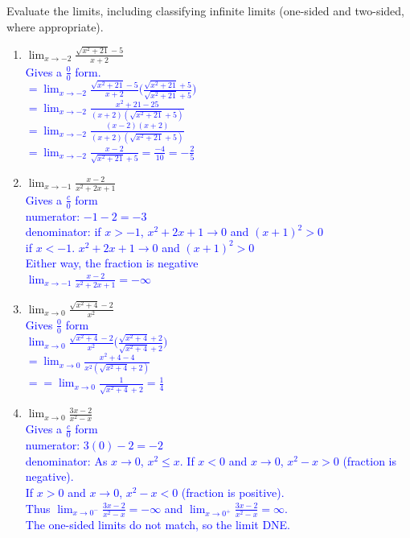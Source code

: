 \documentclass{ximera}
\begin{document}
\begin{exercise}
    Evaluate the limits, including classifying infinite limits (one-sided and two-sided, where appropriate).
\begin{enumerate}
    \item $\displaystyle \lim_{x\rightarrow -2}\frac{\sqrt{x^2+21}-5}{x+2}$ \\
    \textcolor{blue}{ Gives a $\frac{0}{0}$ form.\\
    $\displaystyle=\lim_{x\rightarrow -2} \frac{\sqrt{x^2+21}-5}{x+2}\bigg(\frac{\sqrt{x^2+21}+5}{\sqrt{x^2+21}+5}\bigg)$\\
    $\displaystyle=\lim_{x\rightarrow-2} \frac{x^2+21-25}{(x+2)(\sqrt{x^2+21}+5)}$\\
    $\displaystyle=\lim_{x\rightarrow -2}\frac{(x-2)(x+2)}{(x+2)(\sqrt{x^2+21}+5)}$\\
    $\displaystyle=\lim_{x\rightarrow -2}\frac{x-2}{\sqrt{x^2+21}+5}=\frac{-4}{10}=-\frac25$}
    
    \item $\displaystyle \lim_{x\rightarrow -1}\frac{x-2}{x^2+2x+1}$ \\
    \textcolor{blue}{ Gives a $\frac{c}{0}$ form\\
    numerator: $-1-2=-3$\\
    denominator: if $x>-1$, $x^2+2x+1\rightarrow 0$ and $(x+1)^2>0$\\
    if $x<-1$. $x^2+2x+1\rightarrow 0$ and $(x+1)^2>0$\\
    Either way, the fraction is negative\\
    $\displaystyle\lim_{x\rightarrow -1}\frac{x-2}{x^2+2x+1}=-\infty$}
    
    
    \item $\displaystyle\lim_{x\rightarrow 0}\frac{\sqrt{x^2+4}-2}{x^2}$ \\
    \textcolor{blue}{ Gives $\frac00$ form\\
    $\displaystyle\lim_{x\rightarrow 0}\frac{\sqrt{x^2+4}-2}{x^2}\bigg(\frac{\sqrt{x^2+4}+2}{\sqrt{x^2+4}+2}\bigg)$\\
    $\displaystyle =\lim_{x\rightarrow 0}\frac{x^2+4-4}{x^2(\sqrt{x^2+4}+2)}$\\
    $=\displaystyle =\lim_{x\rightarrow 0}\frac{1}{\sqrt{x^2+4}+2}=\frac{1}{4}$}
    

    \item $\displaystyle \lim_{x\rightarrow 0}\frac{3x-2}{x^2-x}$\\
     \textcolor{blue}{ Gives a $\frac{c}{0}$ form\\
   numerator: $3(0)-2=-2$\\
    denominator: As $x\rightarrow 0$, $x^2\leq x$.  If $x<0$ and $x\rightarrow 0$, $x^2-x>0$ (fraction is negative).\\
    If $x>0$ and $x\rightarrow 0$, $x^2-x<0$ (fraction is positive).\\
    Thus $\displaystyle \lim_{x\rightarrow 0^-} \frac{3x-2}{x^2-x}=-\infty$ and $\displaystyle \lim_{x\rightarrow 0^+} \frac{3x-2}{x^2-x}=\infty$.\\
    The one-sided limits do not match, so the limit DNE.}


\end{enumerate}
\end{exercise}
\end{document}
